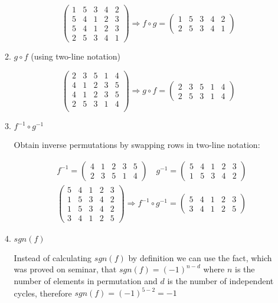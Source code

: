\documentclass{article}
\begin{document}
\begin{enumerate}
\begin{enumerate}
\[
\begin{pmatrix}
1&5&3&4&2\\
5&4&1&2&3\\
\hline
5&4&1&2&3\\
2&5&3&4&1
\end{pmatrix}
\Rightarrow f \circ g = 
\begin{pmatrix}
1&5&3&4&2\\
2&5&3&4&1
\end{pmatrix}
\]

\item $g \circ f$ (using two-line notation)

\[
\begin{pmatrix}
2&3&5&1&4\\
4&1&2&3&5\\
\hline
4&1&2&3&5\\
2&5&3&1&4\\
\end{pmatrix}
\Rightarrow g \circ f = 
\begin{pmatrix}
2&3&5&1&4\\
2&5&3&1&4
\end{pmatrix}
\]

\item $f^{-1} \circ g^{-1}$

Obtain inverse permutations by swapping rows in two-line notation:

\begin{align*}
&f^{-1}=
\begin{pmatrix}
4&1&2&3&5\\
2&3&5&1&4
\end{pmatrix}
\quad g^{-1}=
\begin{pmatrix}
5&4&1&2&3\\
1&5&3&4&2
\end{pmatrix}\\
&\begin{pmatrix}
5&4&1&2&3\\
1&5&3&4&2\\
\hline
1&5&3&4&2\\
3&4&1&2&5
\end{pmatrix}
\Rightarrow f^{-1} \circ g^{-1} = 
\begin{pmatrix}
5&4&1&2&3\\
3&4&1&2&5
\end{pmatrix}
\end{align*}

\item $sgn(f)$

Instead of calculating $sgn(f)$ by definition we can use the fact, which was proved on seminar, that $sgn(f) = (-1)^{n-d}$ where $n$ is the number of elements in permutation and $d$ is the number of independent cycles, therefore $sgn(f) = (-1)^{5-2} = -1$


\end{enumerate}
\end{enumerate}
\end{document}

